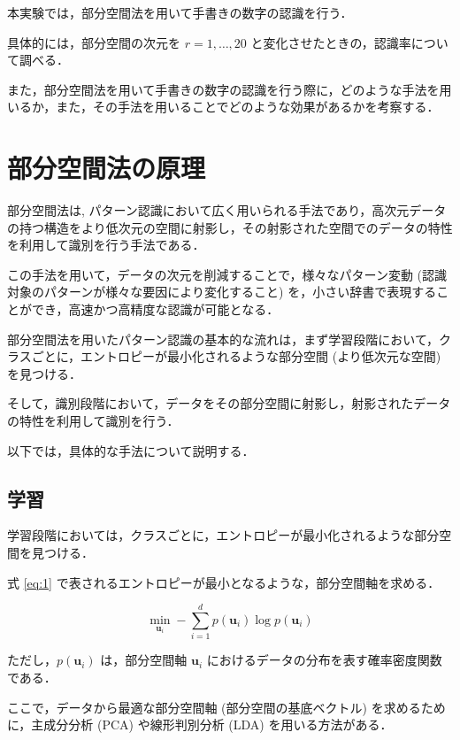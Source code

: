 \documentclass[fleqn, a4paper. 12pt]{jsarticle}
\begin{document}
    本実験では，部分空間法を用いて手書きの数字の認識を行う．

    具体的には，部分空間の次元を $r = 1, \dots, 20$ と変化させたときの，認識率について調べる．

    また，部分空間法を用いて手書きの数字の認識を行う際に，どのような手法を用いるか，また，その手法を用いることでどのような効果があるかを考察する．

  \section{部分空間法の原理}

    部分空間法は, パターン認識において広く用いられる手法であり，高次元データの持つ構造をより低次元の空間に射影し，その射影された空間でのデータの特性を利用して識別を行う手法である．

    この手法を用いて，データの次元を削減することで，様々なパターン変動 (認識対象のパターンが様々な要因により変化すること) を，小さい辞書で表現することができ，高速かつ高精度な認識が可能となる．

    部分空間法を用いたパターン認識の基本的な流れは，まず学習段階において，クラスごとに，エントロピーが最小化されるような部分空間 (より低次元な空間) を見つける．

    そして，識別段階において，データをその部分空間に射影し，射影されたデータの特性を利用して識別を行う．

    以下では，具体的な手法について説明する．

    \subsection{学習}

        学習段階においては，クラスごとに，エントロピーが最小化されるような部分空間を見つける．
    
        式 \ref{eq:1} で表されるエントロピーが最小となるような，部分空間軸を求める．

        \begin{equation}
            \min _{\boldsymbol{u}_i}-\sum_{i=1}^d p\left(\boldsymbol{u}_i\right) \log p\left(\boldsymbol{u}_i\right)
            \label{eq:1}
        \end{equation}

        ただし，$p\left(\boldsymbol{u}_i\right)$ は，部分空間軸 $\boldsymbol{u}_i$ におけるデータの分布を表す確率密度関数である．

        \quad

        ここで，データから最適な部分空間軸 (部分空間の基底ベクトル) を求めるために，主成分分析 (PCA) や線形判別分析 (LDA) を用いる方法がある．
        
\end{document}
